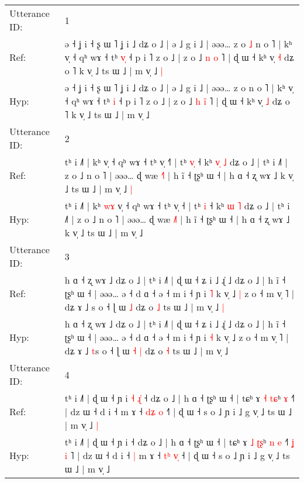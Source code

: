 \documentclass[10pt]{article}
\DeclareRobustCommand{\hl}[1]{{\textcolor{red}{#1}}}
\begin{document}
\begin{longtable}{ll}
\toprule
Utterance ID: & 1 \\
Ref: & ə ˧ ʝ i ˧ ʂ ɯ ˥ ʝ i ˩ dʑ o ˩ | ə ˩ g i ˩ | əəə… z o\hl{ }\hl{˩} n o ˥ | kʰ v̩ ˧ qʰ wɤ ˧ tʰ \hl{v}\hl{̩} ˧ p i ˥ z o ˩ | z o ˩ \hl{n} \hl{}\hl{o} ˥ | ɖ ɯ ˧ kʰ v̩ \hl{˧} dʑ o ˥ k v̩ ˩ ts ɯ ˩ | m v̩ ˩\hl{ }\hl{|}
 \\
Hyp: & ə ˧ ʝ i ˧ ʂ ɯ ˥ ʝ i ˩ dʑ o ˩ | ə ˩ g i ˩ | əəə… z o\hl{}\hl{} n o ˥ | kʰ v̩ ˧ qʰ wɤ ˧ tʰ \hl{}\hl{i} ˧ p i ˥ z o ˩ | z o ˩ \hl{h} \hl{i}\hl{̃} ˥ | ɖ ɯ ˧ kʰ v̩ \hl{˩} dʑ o ˥ k v̩ ˩ ts ɯ ˩ | m v̩ ˩\hl{}\hl{}
 \\
\midrule
Utterance ID: & 2 \\
Ref: & tʰ i ˩˥ | kʰ\hl{}\hl{}\hl{} v̩ ˧ qʰ wɤ ˧ tʰ v̩ ˧\hl{˥} | tʰ \hl{v}\hl{̩} ˧ kʰ \hl{v}\hl{̩} \hl{˩} dʑ o ˩ | tʰ i ˩˥ | z o ˩ n o ˥ | əəə… ɖ wæ \hl{˧}˥ | h ĩ ˧ ʈʂʰ ɯ ˧ | h ɑ ˧ ʐ wɤ ˩ k v̩ ˩ ts ɯ ˩ | m v̩ ˩\hl{ }\hl{|}
 \\
Hyp: & tʰ i ˩˥ | kʰ\hl{ }\hl{w}\hl{ɤ} v̩ ˧ qʰ wɤ ˧ tʰ v̩ ˧\hl{} | tʰ \hl{}\hl{i} ˧ kʰ \hl{}\hl{ɯ} \hl{˥} dʑ o ˩ | tʰ i ˩˥ | z o ˩ n o ˥ | əəə… ɖ wæ \hl{˩}˥ | h ĩ ˧ ʈʂʰ ɯ ˧ | h ɑ ˧ ʐ wɤ ˩ k v̩ ˩ ts ɯ ˩ | m v̩ ˩\hl{}\hl{}
 \\
\midrule
Utterance ID: & 3 \\
Ref: & h ɑ ˧ ʐ wɤ ˩ dʑ o ˩ | tʰ i ˩˥ | ɖ ɯ ˧ ʑ i ˩ ɻ̍ ˩ dʑ o ˩ | h ĩ ˧ ʈʂʰ ɯ ˧ | əəə… ə ˧ d ɑ ˧ ə ˧ m i ˧ ɲ i \hl{˥} k v̩ ˩\hl{ }\hl{|} z o ˧ m v̩ ˥ | dʑ ɤ ˩ \hl{}s o ˧ ɭ ɯ\hl{}\hl{} \hl{˩} dʑ o \hl{˩} ts ɯ ˩ | m v̩ ˩\hl{ }\hl{|}
 \\
Hyp: & h ɑ ˧ ʐ wɤ ˩ dʑ o ˩ | tʰ i ˩˥ | ɖ ɯ ˧ ʑ i ˩ ɻ̍ ˩ dʑ o ˩ | h ĩ ˧ ʈʂʰ ɯ ˧ | əəə… ə ˧ d ɑ ˧ ə ˧ m i ˧ ɲ i \hl{˧} k v̩ ˩\hl{}\hl{} z o ˧ m v̩ ˥ | dʑ ɤ ˩ \hl{t}s o ˧ ɭ ɯ\hl{ }\hl{˧} \hl{|} dʑ o \hl{˧} ts ɯ ˩ | m v̩ ˩\hl{}\hl{}
 \\
\midrule
Utterance ID: & 4 \\
Ref: & tʰ i ˩˥ | ɖ ɯ ˧ ɲ i\hl{ }\hl{˧}\hl{ }\hl{ɻ}\hl{̍} ˧ dʑ o ˩ | h ɑ ˧ ʈʂʰ ɯ ˧ | tɕʰ ɤ \hl{˧} \hl{t}\hl{ɕ}ʰ\hl{}\hl{} \hl{ɤ} ˧\hl{}\hl{}\hl{}\hl{}\hl{}\hl{}˥ | dz ɯ ˧ d i ˧\hl{}\hl{} m ɤ ˧ \hl{d}\hl{ʑ} \hl{}\hl{o} ˧\hl{˥} | ɖ ɯ ˧ s o ˩ ɲ i ˩ g v̩ ˩ ts ɯ ˩ | m v̩ ˩\hl{ }\hl{|}
 \\
Hyp: & tʰ i ˩˥ | ɖ ɯ ˧ ɲ i\hl{}\hl{}\hl{}\hl{}\hl{} ˧ dʑ o ˩ | h ɑ ˧ ʈʂʰ ɯ ˧ | tɕʰ ɤ \hl{˩} \hl{ʈ}\hl{ʂ}ʰ\hl{ }\hl{n} \hl{e} ˧\hl{˥}\hl{ }\hl{ʝ}\hl{ }\hl{i}\hl{ }˥ | dz ɯ ˧ d i ˧\hl{ }\hl{|} m ɤ ˧ \hl{t}\hl{ʰ} \hl{v}\hl{̩} ˧\hl{} | ɖ ɯ ˧ s o ˩ ɲ i ˩ g v̩ ˩ ts ɯ ˩ | m v̩ ˩\hl{}\hl{}
 \\
\midrule

\end{longtable}
\end{document}
